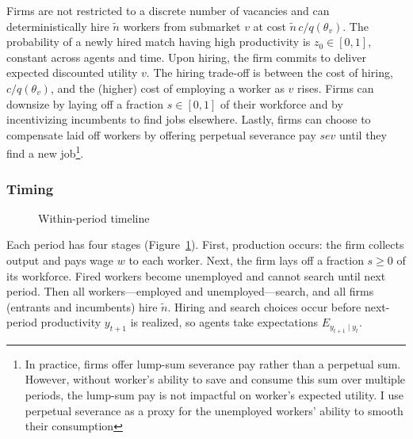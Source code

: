 Firms are not restricted to a discrete number of vacancies and can deterministically hire $\tilde{n}$ workers from submarket $v$ at cost $\tilde{n}\,c/q(\theta_v)$. The probability of a newly hired match having high productivity is $z_0 \in [0,1]$, constant across agents and time. Upon hiring, the firm commits to deliver expected discounted utility $v$. The hiring trade-off is between the cost of hiring, $c/q(\theta_v)$, and the (higher) cost of employing a worker as $v$ rises. Firms can downsize by laying off a fraction $s \in [0,1]$ of their workforce and by incentivizing incumbents to find jobs elsewhere. Lastly, firms can choose to compensate laid off workers by offering perpetual severance pay $sev$ until they find a new job\footnote{In practice, firms offer lump-sum severance pay rather than a perpetual sum. However, without worker's ability to save and consume this sum over multiple periods, the lump-sum pay is not impactful on worker's expected utility. I use perpetual severance as a proxy for the unemployed workers' ability to smooth their consumption}.

\subsubsection*{Timing}
\begin{figure}
\centering
{}
\caption{Within-period timeline} \label{fig:Timing}
\end{figure}

Each period has four stages (Figure~\ref{fig:Timing}). First, production occurs: the firm collects output and pays wage $w$ to each worker. Next, the firm lays off a fraction $s\ge 0$ of its workforce. Fired workers become unemployed and cannot search until next period. Then all workers—employed and unemployed—search, and all firms (entrants and incumbents) hire $\tilde{n}$. Hiring and search choices occur before next-period productivity $y_{t+1}$ is realized, so agents take expectations $E_{y_{t+1}\mid y_t}$.

